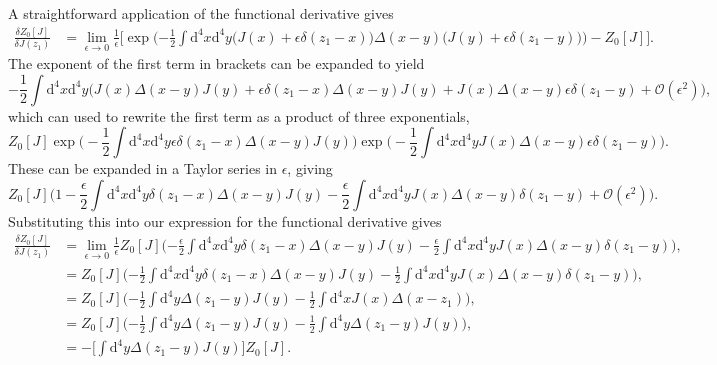 \documentclass[../qft-for-the-gifted-amateur.tex]{subfiles}
\begin{document}
\begin{questions}
	\begin{solution}
		A straightforward application of the functional derivative gives
		\begin{align*}
			\frac{\delta{Z_0}[J]}{\delta{J}(z_1)} &= \lim_{\epsilon\to0}\frac{1}{\epsilon}\Big[\exp\Big({-\frac{1}{2}}\int\mathrm{d}^4x\mathrm{d}^4y\big(J(x) + \epsilon\delta(z_1 - x)\big)\Delta(x - y)\big(J(y) + \epsilon\delta(z_1 - y)\big)\Big) - Z_0[J]\Big].
		\end{align*}
		The exponent of the first term in brackets can be expanded to yield
		\[
			-\frac{1}{2}\int\mathrm{d}^4x\mathrm{d}^4y\Big(J(x)\Delta(x-y)J(y) + \epsilon\delta(z_1-x)\Delta(x-y)J(y) + J(x)\Delta(x-y)\epsilon\delta(z_1-y) + \mathcal{O}(\epsilon^2)\Big),
		\]
		which can used to rewrite the first term as a product of three exponentials,
		\[
			Z_0[J]\exp\Big(-\frac{1}{2}\int\mathrm{d}^4x\mathrm{d}^4y\epsilon\delta(z_1-x)\Delta(x-y)J(y)\Big)\exp\Big(-\frac{1}{2}\int\mathrm{d}^4x\mathrm{d}^4yJ(x)\Delta(x-y)\epsilon\delta(z_1-y)\Big).
		\]
		These can be expanded in a Taylor series in $\epsilon$, giving
		\[
		Z_0[J]\Big(1 - \frac{\epsilon}{2}\int\mathrm{d}^4x\mathrm{d}^4y\delta(z_1-x)\Delta(x-y)J(y) - \frac{\epsilon}{2}\int\mathrm{d}^4x\mathrm{d}^4yJ(x)\Delta(x-y)\delta(z_1-y) + \mathcal{O}(\epsilon^2)\Big).
		\]
		Substituting this into our expression for the functional derivative gives
		\begin{align*}
			\frac{\delta{Z_0}[J]}{\delta{J}(z_1)} &= \lim_{\epsilon\to0}\frac{1}{\epsilon}Z_0[J]\Big({-\frac{\epsilon}{2}}\int\mathrm{d}^4x\mathrm{d}^4y\delta(z_1-x)\Delta(x-y)J(y) - \frac{\epsilon}{2}\int\mathrm{d}^4x\mathrm{d}^4yJ(x)\Delta(x-y)\delta(z_1-y)\Big), \\
			&= Z_0[J]\Big({-\frac{1}{2}}\int\mathrm{d}^4x\mathrm{d}^4y\delta(z_1-x)\Delta(x-y)J(y) - \frac{1}{2}\int\mathrm{d}^4x\mathrm{d}^4yJ(x)\Delta(x-y)\delta(z_1-y)\Big), \\
			&= Z_0[J]\Big({-\frac{1}{2}}\int\mathrm{d}^4y\Delta(z_1-y)J(y) - \frac{1}{2}\int\mathrm{d}^4xJ(x)\Delta(x-z_1)\Big), \\
			&= Z_0[J]\Big({-\frac{1}{2}}\int\mathrm{d}^4y\Delta(z_1-y)J(y) - \frac{1}{2}\int\mathrm{d}^4y\Delta(z_1-y)J(y)\Big), \\
			&= -\Big[\int\mathrm{d}^4y\Delta(z_1-y)J(y)\Big]Z_0[J].
		\end{align*}
	\end{solution}
	
\end{questions}
	
\end{document}
